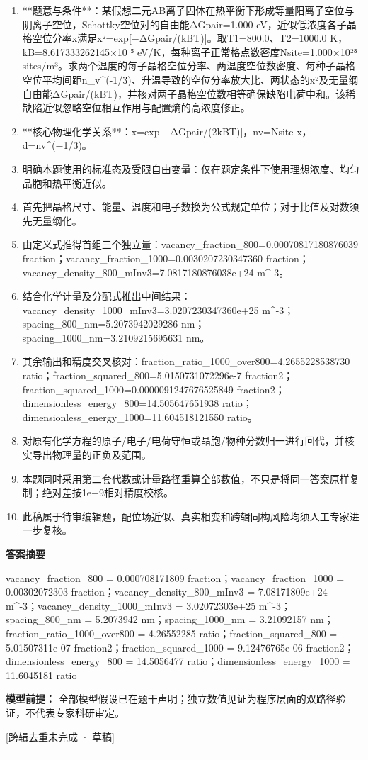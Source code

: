 \documentclass[UTF8,11pt,a4paper]{ctexart}
\begin{document}
\begin{enumerate}
\item **题意与条件**：某假想二元AB离子固体在热平衡下形成等量阳离子空位与阴离子空位，Schottky空位对的自由能ΔGpair=1.000 eV，近似低浓度各子晶格空位分率x满足x²=exp[−ΔGpair/(kBT)]。取T1=800.0、T2=1000.0 K，kB=8.617333262145×10⁻⁵ eV/K，每种离子正常格点数密度Nsite=1.000×10²⁸ sites/m³。求两个温度的每子晶格空位分率、两温度空位数密度、每种子晶格空位平均间距n\_v\textasciicircum{}(-1/3)、升温导致的空位分率放大比、两状态的x²及无量纲自由能ΔGpair/(kBT)，并核对两子晶格空位数相等确保缺陷电荷中和。该稀缺陷近似忽略空位相互作用与配置熵的高浓度修正。
\item **核心物理化学关系**：x=exp[−ΔGpair/(2kBT)]，nv=Nsite x，d=nv\textasciicircum{}(−1/3)。
\item 明确本题使用的标准态及受限自由变量：仅在题定条件下使用理想浓度、均匀晶胞和热平衡近似。
\item 首先把晶格尺寸、能量、温度和电子数换为公式规定单位；对于比值及对数须先无量纲化。
\item 由定义式推得首组三个独立量：vacancy\_fraction\_800=0.00070817180876039 fraction；vacancy\_fraction\_1000=0.0030207230347360 fraction；vacancy\_density\_800\_mInv3=7.0817180876038e+24 m\textasciicircum{}-3。
\item 结合化学计量及分配式推出中间结果：vacancy\_density\_1000\_mInv3=3.0207230347360e+25 m\textasciicircum{}-3；spacing\_800\_nm=5.2073942029286 nm；spacing\_1000\_nm=3.2109215695631 nm。
\item 其余输出和精度交叉核对：fraction\_ratio\_1000\_over800=4.2655228538730 ratio；fraction\_squared\_800=5.0150731072296e-7 fraction2；fraction\_squared\_1000=0.0000091247676525849 fraction2；dimensionless\_energy\_800=14.505647651938 ratio；dimensionless\_energy\_1000=11.604518121550 ratio。
\item 对原有化学方程的原子/电子/电荷守恒或晶胞/物种分数归一进行回代，并核实导出物理量的正负及范围。
\item 本题同时采用第二套代数或计量路径重算全部数值，不只是将同一答案原样复制；绝对差按1e−9相对精度校核。
\item 此稿属于待审编辑题，配位场近似、真实相变和跨辑同构风险均须人工专家进一步复核。
\end{enumerate}
\noindent\textbf{答案摘要}\par
vacancy\_fraction\_800 = 0.000708171809 fraction；vacancy\_fraction\_1000 = 0.00302072303 fraction；vacancy\_density\_800\_mInv3 = 7.08171809e+24 m\textasciicircum{}-3；vacancy\_density\_1000\_mInv3 = 3.02072303e+25 m\textasciicircum{}-3；spacing\_800\_nm = 5.2073942 nm；spacing\_1000\_nm = 3.21092157 nm；fraction\_ratio\_1000\_over800 = 4.26552285 ratio；fraction\_squared\_800 = 5.01507311e-07 fraction2；fraction\_squared\_1000 = 9.12476765e-06 fraction2；dimensionless\_energy\_800 = 14.5056477 ratio；dimensionless\_energy\_1000 = 11.6045181 ratio\par
\noindent\textbf{模型前提：}
全部模型假设已在题干声明；独立数值见证为程序层面的双路径验证，不代表专家科研审定。\par
\noindent\textcolor{red!65!black}{[跨辑去重未完成 · 草稿]} \par
\medskip\hrule\medskip
{}
\end{document}
